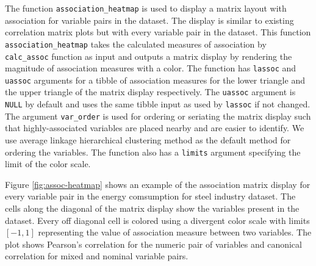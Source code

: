 The function \texttt{association\_heatmap} is used to display a matrix
layout with association for variable pairs in the dataset. The display
is similar to existing correlation matrix plots but with every variable
pair in the dataset. This function \texttt{association\_heatmap} takes
the calculated measures of association by \texttt{calc\_assoc} function
as input and outputs a matrix display by rendering the magnitude of
association measures with a color. The function has \texttt{lassoc} and
\texttt{uassoc} arguments for a tibble of association measures for the
lower triangle and the upper triangle of the matrix display
respectively. The \texttt{uassoc} argument is \texttt{NULL} by default
and uses the same tibble input as used by \texttt{lassoc} if not
changed. The argument \texttt{var\_order} is used for ordering or
seriating the matrix display such that highly-associated variables are
placed nearby and are easier to identify. We use average linkage
hierarchical clustering method as the default method for ordering the
variables. The function also has a \texttt{limits} argument specifying
the limit of the color scale.

Figure \ref{fig:assoc-heatmap} shows an example of the association
matrix display for every variable pair in the energy comsumption for
steel industry dataset. The cells along the diagonal of the matrix
display show the variables present in the dataset. Every off diagonal
cell is colored using a divergent color scale with limits \([-1,1]\)
representing the value of association measure between two variables. The
plot shows Pearson's correlation for the numeric pair of variables and
canonical correlation for mixed and nominal variable pairs.

